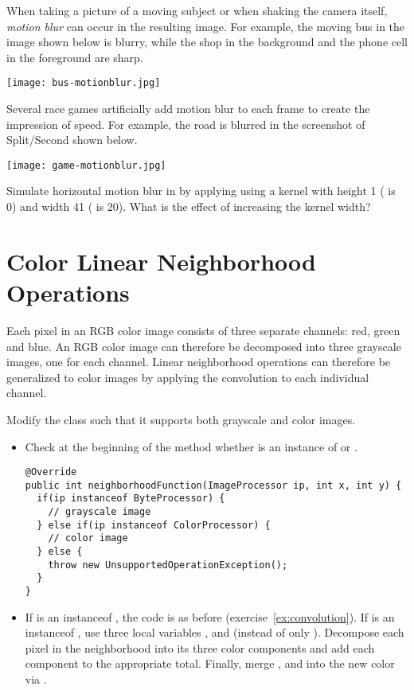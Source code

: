 \documentclass{book}
\begin{document}
\begin{exercise}\label{ex:motionblur}When taking a picture of a moving subject or when shaking the camera itself, \emph{motion blur} can occur in the resulting image. For example, the moving bus in the image shown below is blurry, while the shop in the background and the phone cell in the foreground are sharp.
\begin{center}
\texttt{[image: bus-motionblur.jpg]}
\end{center}
Several race games artificially add motion blur to each frame to create the impression of speed. For example, the road is blurred in the screenshot of Split/Second shown below.  
\begin{center}
\texttt{[image: game-motionblur.jpg]}
\end{center}

Simulate horizontal motion blur in  by applying  using a kernel with height 1 ( is 0) and width 41 ( is 20). What is the effect of increasing the kernel width?
\end{exercise}

\section{Color Linear Neighborhood Operations}
Each pixel in an RGB color image consists of three separate channels: red, green and blue. An RGB color image can therefore be decomposed into three grayscale images, one for each channel. Linear neighborhood operations can therefore be generalized to color images by applying the convolution to each individual channel.   

\begin{exercise}
Modify the class  such that it supports both grayscale and color images.
\begin{itemize}
  \item Check at the beginning of the method  whether  is an instance of  or .
\begin{lstlisting}
@Override
public int neighborhoodFunction(ImageProcessor ip, int x, int y) {
  if(ip instanceof ByteProcessor) {
    // grayscale image   
  } else if(ip instanceof ColorProcessor) {
    // color image  
  } else {
    throw new UnsupportedOperationException();  
  }
}
\end{lstlisting}
  \item If  is an instanceof , the code is as before (exercise~\ref{ex:convolution}). If  is an instanceof , use three local variables ,  and  (instead of only ). Decompose each pixel in the neighborhood into its three color components and add each component to the appropriate total. Finally, merge ,  and  into the new color via .
\end{itemize}
\end{exercise}
 
\end{document}
